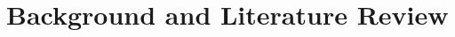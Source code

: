 \documentclass[12pt, a4paper]{article}
\begin{document}
\section*{Background and Literature Review}

\pagebreak



\pagebreak
\end{document}
